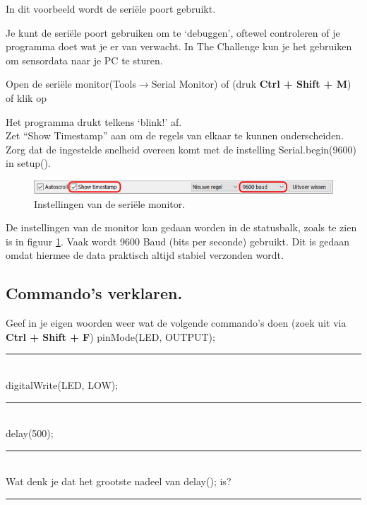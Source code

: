 In dit voorbeeld wordt de seriële poort gebruikt.

Je kunt de seriële poort gebruiken om te ‘debuggen’, oftewel controleren of je programma doet wat je er van verwacht. In The Challenge kun je het gebruiken om sensordata naar je PC te sturen.

Open de seriële monitor(Tools$\rightarrow$Serial Monitor) of (druk \colorbox{mygray}{\textbf{Ctrl + Shift + M}}) of klik op 

Het programma drukt telkens ‘blink!’ af.\\ 
Zet “Show Timestamp” aan om de regels van elkaar te kunnen onderscheiden.\\ 
Zorg dat de ingestelde snelheid overeen komt met de instelling \textcolor{BurntOrange}{Serial.begin}(9600) in  \textcolor{OliveGreen}{setup}(). 
\begin{figure}[h!]
	\captionsetup{justification=centering}
	\includegraphics[width=0.99 \linewidth]{figuren/ardSerIns}
	\centering
	\caption{Instellingen van de seriële monitor.}
	\label{fig:arSeIn}
\end{figure}
De instellingen van de monitor kan gedaan worden in de statusbalk, zoals te zien is in figuur \ref{fig:arSeIn}.
Vaak wordt 9600 Baud (bits per seconde) gebruikt. Dit is gedaan omdat hiermee de data praktisch altijd stabiel verzonden wordt.

\subsection{Commando's verklaren.}

Geef in je eigen woorden weer wat de volgende commando’s doen (zoek uit via  \colorbox{mygray}{\textbf{Ctrl + Shift + F}})
\textcolor{BurntOrange}{pinMode}(LED, \textcolor{BlueGreen}{OUTPUT});\\
\vspace{1cm}
\hrule
~\\    
\vspace{1cm}
\textcolor{BurntOrange}{digitalWrite}(LED, \textcolor{BlueGreen}{LOW});\\
\vspace{1cm}
\hrule
~\\    
\vspace{0.8cm}
\textcolor{BurntOrange}{delay}(500);
 \vspace{1cm}
 \hrule
 ~\\    
 Wat denk je dat het grootste nadeel van \textcolor{BurntOrange}{delay}();  is?
 \vspace{1cm}
 \hrule
 
